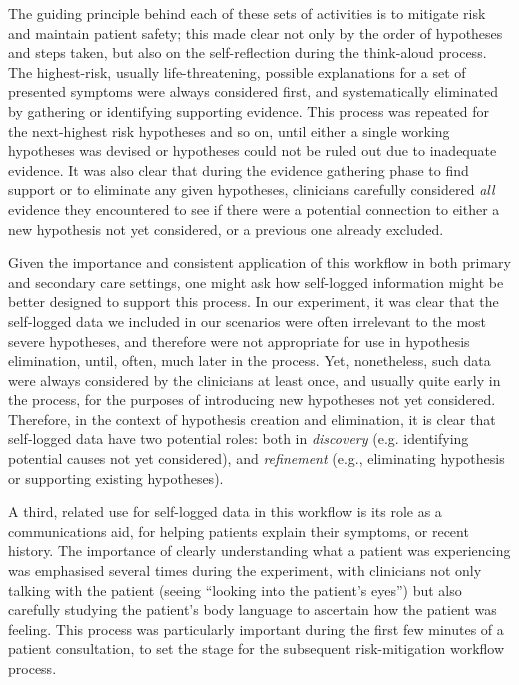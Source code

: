 \documentclass{sigchi}
\begin{document}
The guiding principle behind each of these sets of activities is to mitigate risk and maintain patient safety;  this made clear not only by the order of hypotheses and steps taken, but also on the self-reflection during the think-aloud process. The highest-risk, usually life-threatening, possible explanations for a set of presented symptoms were always considered first, and systematically eliminated by gathering or identifying supporting evidence.  This process was repeated for the next-highest risk hypotheses and so on, until either a single working hypotheses was devised or hypotheses could not be ruled out due to inadequate evidence. It was also clear that during the evidence gathering phase to find support or to eliminate any given hypotheses, clinicians carefully considered \emph{all} evidence they encountered to see if there were a potential connection to either a new hypothesis not yet considered, or a previous one already excluded.

Given the importance and consistent application of this workflow in both primary and secondary care settings, one might ask how self-logged information might be better designed to support this process. In our experiment, it was clear that the self-logged data we included in our scenarios were often irrelevant to the most severe hypotheses, and therefore were not appropriate for use in hypothesis elimination, until, often, much later in the process.  Yet, nonetheless, such data were always considered by the clinicians at least once, and usually quite early in the process, for the purposes of introducing new hypotheses not yet considered.  Therefore, in the context of hypothesis creation and elimination, it is clear that self-logged data have two potential roles: both in \emph{discovery} (e.g. identifying potential causes not yet considered), and \emph{refinement} (e.g., eliminating hypothesis or supporting existing hypotheses).

A third, related use for self-logged data in this workflow is its role as a communications aid, for helping patients explain their symptoms, or recent history.  The importance of clearly understanding what a patient was experiencing was emphasised several times during the experiment, with clinicians not only talking with the patient (seeing ``looking into the patient's eyes'') but also carefully studying the patient's body language to ascertain how the patient was feeling.  This process was particularly important during the first few minutes of a patient consultation, to set the stage for the subsequent risk-mitigation workflow process.
\end{document}
